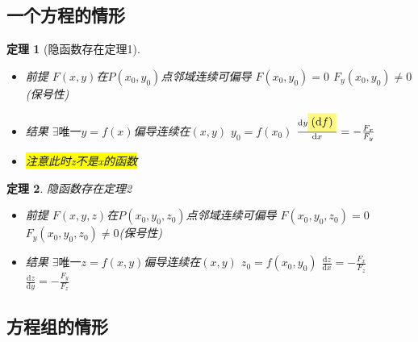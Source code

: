\documentclass[UTF8,a4paper,12pt,scheme=chinese]{ctexbook}
\newcommand{\ud}{\mathrm{d}}
\newcommand{\hl}[1]{\colorbox{yellow}{#1}}
\newcommand{\hla}[1]{%
	\colorbox{yellow!50}{$\displaystyle#1$}}
\newtheorem{theorem}{定理}[section]
\theoremstyle{plain}
\begin{document}
	\subsection{一个方程的情形}
	\begin{theorem}[隐函数存在定理1]
		\begin{itemize}
			\item 前提
			\subitem $F(x,y)$在$P(x_0,y_0)$点邻域连续可偏导
			\subitem $F(x_0,y_0)=0$
			\subitem $F_y(x_0,y_0)\neq0$\quad(保号性)
			\item 结果
			\subitem $\exists\mbox{唯一}y=f(x)$偏导连续在$(x,y)$
			\subitem $y_0=f(x_0)$
			\subitem $\frac{\ud y\hla{(\ud f)}}{\ud x}=-\frac{F_x}{F_y}$
			\item \hl{注意此时z不是x的函数}
		\end{itemize}
	\end{theorem}
	\begin{theorem}
		隐函数存在定理2
		\begin{itemize}
			\item 前提
			\subitem $F(x,y,z)$在$P(x_0,y_0,z_0)$点邻域连续可偏导
			\subitem $F(x_0,y_0,z_0)=0$
			\subitem $F_y(x_0,y_0,z_0)\neq0$\quad(保号性)
			\item 结果
			\subitem $\exists\mbox{唯一}z=f(x,y)$偏导连续在$(x,y)$
			\subitem $z_0=f(x_0,y_0)$
			\subitem $\frac{\ud z}{\ud x}=-\frac{F_x}{F_z}$
			\subitem $\frac{\ud z}{\ud y}=-\frac{F_y}{F_z}$
		\end{itemize}
	\end{theorem}
	\subsection{方程组的情形}
\end{document}
